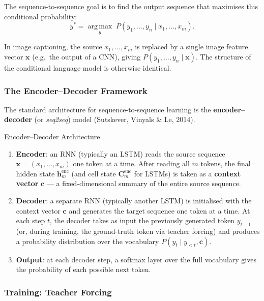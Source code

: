\documentclass[11pt,a4paper]{article}
\newcommand{\term}[1]{\textcolor{DefGreen}{\textbf{#1}}\index{#1}}
\begin{document}
The sequence-to-sequence goal is to find the output sequence that maximises this conditional probability:
\[
  y^* = \operatorname*{arg\,max}_{y}\; P(y_1, \ldots, y_n \mid x_1, \ldots, x_m).
\]

\begin{notebox}
In image captioning, the source $x_1, \ldots, x_m$ is replaced by a single image feature vector $\mathbf{x}$ (e.g.\ the output of a CNN), giving $P(y_1, \ldots, y_n \mid \mathbf{x})$. The structure of the conditional language model is otherwise identical.
\end{notebox}

\subsubsection{The Encoder--Decoder Framework}
\label{sec:encoder_decoder}

The standard architecture for sequence-to-sequence learning is the \term{encoder--decoder} (or \emph{seq2seq}) model (Sutskever, Vinyals \& Le, 2014).

\begin{thmbox}{Encoder--Decoder Architecture}
\begin{enumerate}
  \item \textbf{Encoder}: an RNN (typically an LSTM) reads the source sequence $\mathbf{x} = (x_1, \ldots, x_m)$ one token at a time. After reading all $m$ tokens, the final hidden state $\mathbf{h}_m^{\text{enc}}$ (and cell state $\mathbf{C}_m^{\text{enc}}$ for LSTMs) is taken as a \term{context vector} $\mathbf{c}$ — a fixed-dimensional summary of the entire source sequence.
  \item \textbf{Decoder}: a separate RNN (typically another LSTM) is initialised with the context vector $\mathbf{c}$ and generates the target sequence one token at a time. At each step $t$, the decoder takes as input the previously generated token $y_{t-1}$ (or, during training, the ground-truth token via teacher forcing) and produces a probability distribution over the vocabulary $P(y_t \mid y_{<t}, \mathbf{c})$.
  \item \textbf{Output}: at each decoder step, a softmax layer over the full vocabulary gives the probability of each possible next token.
\end{enumerate}
\end{thmbox}

\subsubsection{Training: Teacher Forcing}
\end{document}
